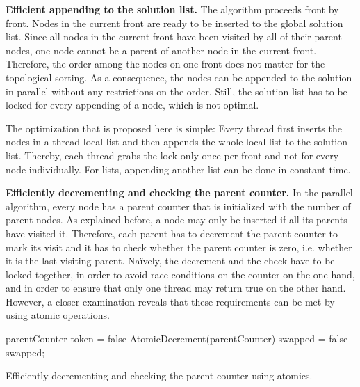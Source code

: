 \documentclass[letterpaper]{article}
\newenvironment{listing}[1][htb]
  {\renewcommand{\algorithmcfname}{Listing}%
   \begin{algorithm}[#1]%
  }{\end{algorithm}}
\newcommand{\mypar}[1]{{\bf #1.}}
\begin{document}
\mypar{Efficient appending to the solution list}
The algorithm proceeds front by front.
Nodes in the current front are ready to be inserted to the global solution list.
Since all nodes in the current front have been visited by all of their parent nodes, one node cannot be a parent of another node in the current front.
Therefore, the order among the nodes on one front does not matter for the topological sorting.
As a consequence, the nodes can be appended to the solution in parallel without any restrictions on the order.
Still, the solution list has to be locked for every appending of a node, which is not optimal.

The optimization that is proposed here is simple: Every thread first inserts the nodes in a thread-local list and then appends the whole local list to the solution list.
Thereby, each thread grabs the lock only once per front and not for every node individually.
For lists, appending another list can be done in constant time.

\mypar{Efficiently decrementing and checking the parent counter}
In the parallel algorithm, every node has a parent counter that is initialized with the number of parent nodes.
As explained before, a node may only be inserted if all its parents have visited it.
Therefore, each parent has to decrement the parent counter to mark its visit and it has to check whether the parent counter is zero, i.e. whether it is the last visiting parent.
Na{\"i}vely, the decrement and the check have to be locked together, in order to avoid race conditions on the counter on the one hand, and in order to ensure that only one thread may return true on the other hand. 
However, a closer examination reveals that these requirements can be met by using atomic operations.

\begin{listing}
  \KwInt parentCounter\;
  \KwBool token = false\;
   {
    AtomicDecrement(parentCounter)\;
    \KwBool swapped = false\;
    \KwRet swapped;
  }
 \caption{Efficiently decrementing and checking the parent counter using atomics.}
 \label{lst:parentCounter}
\end{listing}
\end{document}
